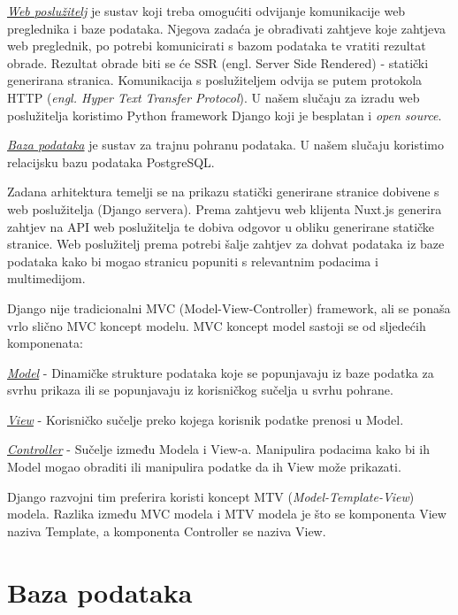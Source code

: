 	\underline{\textit{Web poslužitelj}} je sustav koji treba omogućiti odvijanje komunikacije web preglednika i baze podataka. Njegova zadaća je obrađivati zahtjeve koje zahtjeva web preglednik, po potrebi komunicirati s bazom podataka te vratiti rezultat obrade. Rezultat obrade biti se će SSR (engl. Server Side Rendered) - statički generirana stranica. Komunikacija s poslužiteljem odvija se putem protokola HTTP (\emph{engl. Hyper Text Transfer Protocol}). U našem slučaju za izradu web poslužitelja koristimo Python framework Django koji je besplatan i \emph{open source}.

	\underline{\textit{Baza podataka}} je sustav za trajnu pohranu podataka. U našem slučaju koristimo relacijsku bazu podataka PostgreSQL.

	Zadana arhitektura temelji se na prikazu statički generirane stranice dobivene s web poslužitelja (Django servera). Prema zahtjevu web klijenta Nuxt.js generira zahtjev na API web poslužitelja te dobiva odgovor u obliku generirane statičke stranice. Web poslužitelj prema potrebi šalje zahtjev za dohvat podataka iz baze podataka kako bi mogao stranicu popuniti s relevantnim podacima i multimedijom.

	Django nije tradicionalni MVC (Model-View-Controller) framework, ali se ponaša vrlo slično MVC koncept modelu. MVC koncept model sastoji se od sljedećih komponenata: 
	\begin{packed_item}
		\item{\underline{\textit{Model}} - Dinamičke strukture podataka koje se popunjavaju iz baze podatka za svrhu prikaza ili se popunjavaju iz korisničkog sučelja u svrhu pohrane.}
		\item{\underline{\textit{View}} - Korisničko sučelje preko kojega korisnik podatke prenosi u Model.}
		\item{\underline{\textit{Controller}} - Sučelje između Modela i View-a. Manipulira podacima kako bi ih Model mogao obraditi ili manipulira podatke da ih View može prikazati.}
	\end{packed_item}

	Django razvojni tim preferira koristi koncept MTV (\emph{Model-Template-View}) modela. Razlika između MVC modela i MTV modela je što se komponenta View naziva Template, a komponenta Controller se naziva View.

	\pagebreak
				
	\section{Baza podataka}
			
